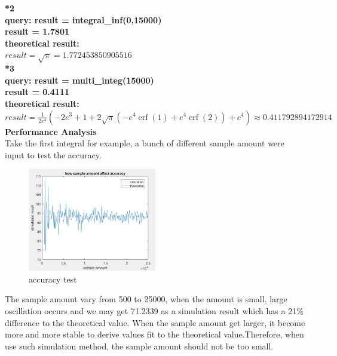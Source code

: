 \documentclass[twoside]{article}
\begin{document}
\noindent \textbf {*2}\\
\noindent \textbf {query: result = integral\_inf(0,15000)\\}
\noindent \textbf {result = 1.7801\\}
\noindent \textbf {theoretical result: \\
$result = \sqrt{{\pi}}= 1.772453850905516$}\\[10pt]

\noindent \textbf {*3}\\
\noindent \textbf {query: result = multi\_integ(15000)\\}
\noindent \textbf {result = 0.4111\\}
\noindent \textbf {theoretical result:\\ $result = \frac{1}{2 e^{4}} \left(- 2 e^{3} + 1 + 2 \sqrt{\pi} \left(- e^{4} \operatorname{erf}{\left (1 \right )} + e^{4} \operatorname{erf}{\left (2 \right )}\right) + e^{4}\right)\approx 0.411792894172914$}\\

\noindent \textbf {Performance Analysis\\}
Take the first integral for example, a bunch of different sample amount were input to test the accuracy.\\
\begin{multicols}{2}
\begin{figure}[H]
   \centering
   \includegraphics[width = 0.5\textwidth]{../data/accuracy1.png}  
   \caption{accuracy test}
\end{figure}
The sample amount vary from 500 to 25000, when the amount is small, large oscillation occurs and we may get 71.2339 as a simulation result which has a 21\% difference to the theoretical value. When the sample amount get larger, it become more and more stable to derive values fit to the theoretical value.Therefore, when use such simulation method, the sample amount should not be too small.\\
\end{multicols}
\end{document}
